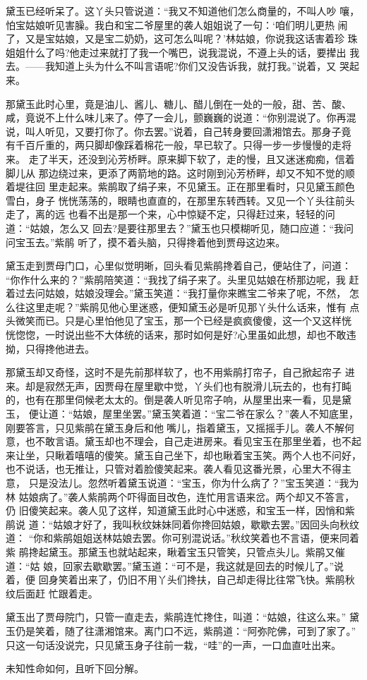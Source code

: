 黛玉已经听呆了。这丫头只管说道：“我又不知道他们怎么商量的，不叫人吵
嚷，怕宝姑娘听见害臊。我白和宝二爷屋里的袭人姐姐说了一句：‘咱们明儿更热
闹了，又是宝姑娘，又是宝二奶奶，这可怎么叫呢？’林姑娘，你说我这话害着珍
珠姐姐什么了吗?他走过来就打了我一个嘴巴，说我混说，不遵上头的话，要撵出
我去。——我知道上头为什么不叫言语呢?你们又没告诉我，就打我。”说着，又
哭起来。

那黛玉此时心里，竟是油儿、酱儿、糖儿、醋儿倒在一处的一般，甜、苦、酸、
咸，竟说不上什么味儿来了。停了一会儿，颤巍巍的说道：“你别混说了。你再混
说，叫人听见，又要打你了。你去罢。”说着，自己转身要回潇湘馆去。那身子竟
有千百斤重的，两只脚却像踩着棉花一般，早已软了。只得一步一步慢慢的走将来。
走了半天，还没到沁芳桥畔。原来脚下软了，走的慢，且又迷迷痴痴，信着脚儿从
那边绕过来，更添了两箭地的路。这时刚到沁芳桥畔，却又不知不觉的顺着堤往回
里走起来。紫鹃取了绢子来，不见黛玉。正在那里看时，只见黛玉颜色雪白，身子
恍恍荡荡的，眼睛也直直的，在那里东转西转。又见一个丫头往前头走了，离的远
也看不出是那一个来，心中惊疑不定，只得赶过来，轻轻的问道：“姑娘，怎么又
回去?是要往那里去？”黛玉也只模糊听见，随口应道：“我问问宝玉去。”紫鹃
听了，摸不着头脑，只得搀着他到贾母这边来。

黛玉走到贾母门口，心里似觉明晰，回头看见紫鹃搀着自己，便站住了，问道：
“你作什么来的？”紫鹃陪笑道：“我找了绢子来了。头里见姑娘在桥那边呢，我
赶着过去问姑娘，姑娘没理会。”黛玉笑道：“我打量你来瞧宝二爷来了呢，不然，
怎么往这里走呢？”紫鹃见他心里迷惑，便知黛玉必是听见那丫头什么话来，惟有
点头微笑而已。只是心里怕他见了宝玉，那一个已经是疯疯傻傻，这一个又这样恍
恍惚惚，一时说出些不大体统的话来，那时如何是好?心里虽如此想，却也不敢违
拗，只得搀他进去。

那黛玉却又奇怪，这时不是先前那样软了，也不用紫鹃打帘子，自己掀起帘子
进来。却是寂然无声，因贾母在屋里歇中觉，丫头们也有脱滑儿玩去的，也有打盹
的，也有在那里伺候老太太的。倒是袭人听见帘子响，从屋里出来一看，见是黛玉，
便让道：“姑娘，屋里坐罢。”黛玉笑着道：“宝二爷在家么？”袭人不知底里，
刚要答言，只见紫鹃在黛玉身后和他嘴儿，指着黛玉，又摇摇手儿。袭人不解何
意，也不敢言语。黛玉却也不理会，自己走进房来。看见宝玉在那里坐着，也不起
来让坐，只瞅着嘻嘻的傻笑。黛玉自己坐下，却也瞅着宝玉笑。两个人也不问好，
也不说话，也无推让，只管对着脸傻笑起来。袭人看见这番光景，心里大不得主意，
只是没法儿。忽然听着黛玉说道：“宝玉，你为什么病了？”宝玉笑道：“我为林
姑娘病了。”袭人紫鹃两个吓得面目改色，连忙用言语来岔。两个却又不答言，仍
旧傻笑起来。袭人见了这样，知道黛玉此时心中迷惑，和宝玉一样，因悄和紫鹃说
道：“姑娘才好了，我叫秋纹妹妹同着你搀回姑娘，歇歇去罢。”因回头向秋纹道：
“你和紫鹃姐姐送林姑娘去罢。你可别混说话。”秋纹笑着也不言语，便来同着紫
鹃搀起黛玉。那黛玉也就站起来，瞅着宝玉只管笑，只管点头儿。紫鹃又催道：“姑
娘，回家去歇歇罢。”黛玉道：“可不是，我这就是回去的时候儿了。”说着，便
回身笑着出来了，仍旧不用丫头们搀扶，自己却走得比往常飞快。紫鹃秋纹后面赶
忙跟着走。

黛玉出了贾母院门，只管一直走去，紫鹃连忙搀住，叫道：“姑娘，往这么来。”
黛玉仍是笑着，随了往潇湘馆来。离门口不远，紫鹃道：“阿弥陀佛，可到了家了。”
只这一句话没说完，只见黛玉身子往前一栽，“哇”的一声，一口血直吐出来。

未知性命如何，且听下回分解。
